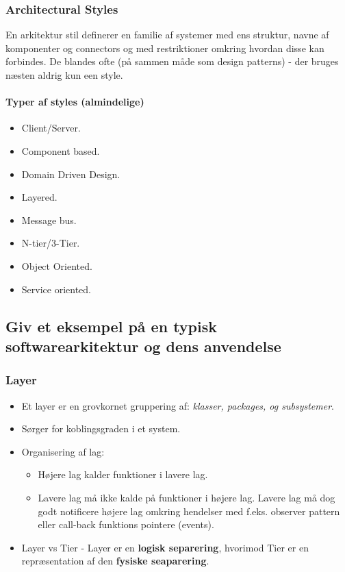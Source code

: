 \subsubsection{Architectural Styles}
En arkitektur stil definerer en familie af systemer med ens struktur, navne af komponenter og connectors og med restriktioner omkring hvordan disse kan forbindes. De blandes ofte (på sammen måde som design patterns) - der bruges næsten aldrig kun een style.

\paragraph{Typer af styles (almindelige)}

\begin{itemize}
	\item Client/Server.
	\item Component based.
	\item Domain Driven Design.
	\item Layered.
	\item Message bus.
	\item N-tier/3-Tier.
	\item Object Oriented.
	\item Service oriented.
\end{itemize}


\subsection{Giv et eksempel på en typisk softwarearkitektur og dens anvendelse}

\subsubsection{Layer}
\begin{itemize}
	\item Et layer er en grovkornet gruppering af: \textit{klasser, packages, og subsystemer}.
	\item Sørger for koblingsgraden i et system.
	\item Organisering af lag:
	\begin{itemize}
		\item Højere lag kalder funktioner i lavere lag.
		\item Lavere lag må ikke kalde på funktioner i højere lag. Lavere lag må dog godt notificere højere lag omkring hendelser med f.eks. observer pattern eller call-back funktions pointere (events).
	\end{itemize}
	\item Layer vs Tier - Layer er en \textbf{logisk separering}, hvorimod Tier er en repræsentation af den \textbf{fysiske seaparering}.
\end{itemize}

